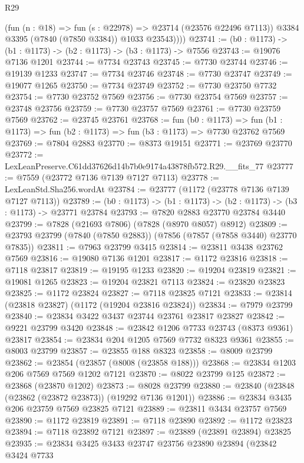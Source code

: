 \begin{lexlean}{R29}
\begin{coremodule}
            (fun (n : @18) => fun (s : @22978) => @23714 (@23576 @22496 @7113))
            @3384
            @3395
            (@7840 (@7850 @3384))
            @1033
            @23543))))
@23741 := (b0 : @1173) -> (b1 : @1173) -> (b2 : @1173) -> (b3 : @1173) -> @7556
@23743 := @19076 @7136 @1201
@23744 := @7734 @23743
@23745 := @7730 @23744
@23746 := @19139 @1233
@23747 := @7734 @23746
@23748 := @7730 @23747
@23749 := @19077 @1265
@23750 := @7734 @23749
@23752 := @7730 @23750 @7732
@23754 := @7730 @23752 @7569
@23756 := @7730 @23754 @7569
@23757 := @23748 @23756
@23759 := @7730 @23757 @7569
@23761 := @7730 @23759 @7569
@23762 := @23745 @23761
@23768 := fun (b0 : @1173) =>
  fun (b1 : @1173) => fun (b2 : @1173) => fun (b3 : @1173) => @7730 @23762 @7569
@23769 := @7804 @2883
@23770 := @8373 @19151
@23771 := @23769 @23770
@23772 := LexLeanPreserve.C61dd37626d14b7b0e9174a43878fb572.R29.__fits_77
@23777 := @7559 (@23772 @7136 @7139 @7127 @7113)
@23778 := LexLeanStd.Sha256.wordAt
@23784 := @23777 (@1172 (@23778 @7136 @7139 @7127 @7113))
@23789 := (b0 : @1173) -> (b1 : @1173) -> (b2 : @1173) -> (b3 : @1173) -> @23771 @23784
@23793 := @7820 @2883 @23770 @23784 @3440
@23799 := @7828 (@21693 @7806) (@7828 (@8970 @8057) @8912)
@23809 := @23793 @23799 (@7840 (@7850 @2883)) (@7856 (@7857 (@7858 @3440) @23770 @7835))
@23811 := @7963 @23799 @3415
@23814 := @23811 @3438 @23762 @7569
@23816 := @19080 @7136 @1201
@23817 := @1172 @23816
@23818 := @7118 @23817
@23819 := @19195 @1233
@23820 := @19204 @23819
@23821 := @19081 @1265
@23823 := @19204 @23821 @7113
@23824 := @23820 @23823
@23825 := @1172 @23824
@23827 := @7118 @23825 @7121
@23833 := @23814 (@23818 @23827) (@1172 (@19204 @23816 @23824))
@23834 := @7979 @23799
@23840 := @23834 @3422 @3437 @23744 @23761 @23817 @23827
@23842 := @9221 @23799 @3420
@23848 := @23842 @1206 @7733 @23743 (@8373 @9361) @23817
@23854 := @23834 @204 @1205 @7569 @7732 @8323 @9361
@23855 := @8003 @23799
@23857 := @23855 @188 @8323
@23858 := @8009 @23799
@23862 := @23854 (@23857 (@8008 (@23858 @188)))
@23868 := @23834 @1203 @206 @7569 @7569 @1202 @7121
@23870 := @8022 @23799 @125
@23872 := @23868 (@23870 @1202)
@23873 := @8028 @23799
@23880 := @23840 (@23848 (@23862 (@23872 @23873)) (@19292 @7136 @1201))
@23886 := @23834 @3435 @206 @23759 @7569 @23825 @7121
@23889 := @23811 @3434 @23757 @7569
@23890 := @1172 @23819
@23891 := @7118 @23890
@23892 := @1172 @23823
@23894 := @7118 @23892 @7121
@23897 := @23889 (@23891 @23894) @23825
@23935 := @23834
    @3425
    @3433
    @23747
    @23756
    @23890
    @23894
    (@23842
      @3424
      @7733

\end{coremodule}
\end{lexlean}
